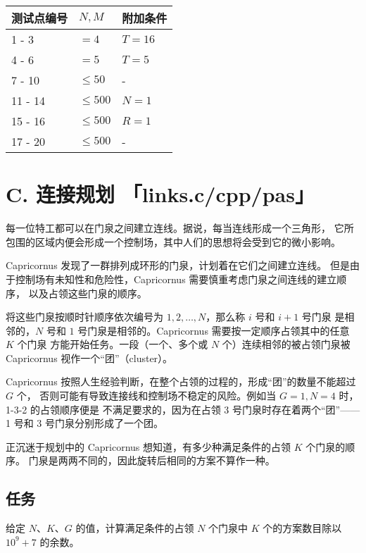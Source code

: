 \documentclass[UTF8, 11pt, a4paper]{article}
\begin{document}
\begin{table}[h]\centering
\begin{tabularx}{0.85 \textwidth}{X|X|X} \hline
测试点编号 & $N, M$     & 附加条件 \\ \hline\hline
1 - 3      & $= 4$      & $T = 16$ \\ \hline
4 - 6      & $= 5$      & $T = 5$ \\ \hline
7 - 10     & $\leq 50$  & - \\ \hline
11 - 14    & $\leq 500$ & $N = 1$ \\ \hline
15 - 16    & $\leq 500$ & $R = 1$ \\ \hline
17 - 20    & $\leq 500$ & - \\ \hline
\end{tabularx}
\end{table}
\newpage


\section*{C. \makebox[1em]{} 连接规划 \makebox[2.5em]{} \small{「links.c/cpp/pas」}}
每一位特工都可以在门泉之间建立连线。据说，每当连线形成一个三角形，%
它所包围的区域内便会形成一个控制场，其中人们的思想将会受到它的微小影响。

Capricornus 发现了一群排列成环形的门泉，计划着在它们之间建立连线。%
但是由于控制场有未知性和危险性，Capricornus 需要慎重考虑门泉之间连线的建立顺序，%
以及占领这些门泉的顺序。

将这些门泉按顺时针顺序依次编号为 $1, 2, \dots, N$，那么称 $i$ 号和 $i + 1$ 号门泉%
是相邻的，$N$ 号和 $1$ 号门泉是相邻的。Capricornus 需要按一定顺序占领其中的任意 $K$ 个门泉%
方能开始任务。一段（一个、多个或 $N$ 个）连续相邻的被占领门泉被 Capricornus 视作一个“团”（cluster）。

Capricornus 按照人生经验判断，在整个占领的过程的，形成“团”的数量不能超过 $G$ 个，%
否则可能有导致连接线和控制场不稳定的风险。例如当 $G = 1, N = 4$ 时，1-3-2 的占领顺序便是%
不满足要求的，因为在占领 3 号门泉时存在着两个“团”——1 号和 3 号门泉分别形成了一个团。

正沉迷于规划中的 Capricornus 想知道，有多少种满足条件的占领 $K$ 个门泉的顺序。%
门泉是两两不同的，因此旋转后相同的方案不算作一种。

\subsection*{任务}
给定 $N$、$K$、$G$ 的值，计算满足条件的占领 $N$ 个门泉中 $K$ 个的方案数目除以 $10^9 + 7$ 的余数。
\end{document}
